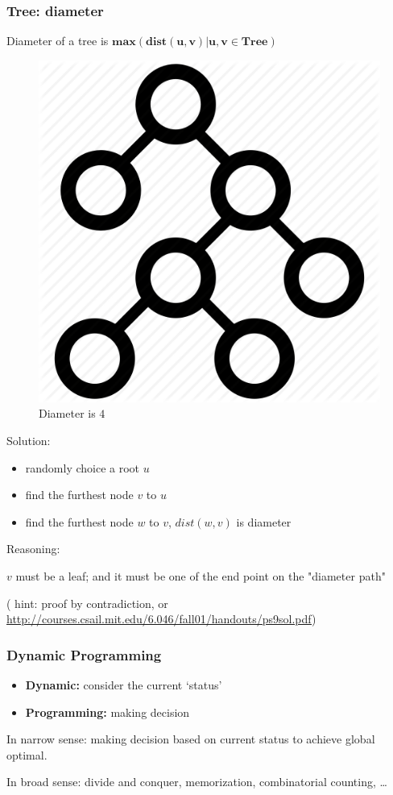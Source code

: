 \documentclass{beamer}
\begin{document}
\begin{frame}
  \frametitle{Tree: diameter}
\begin{definition}
  Diameter of a tree is $\mathbf{max(dist(u, v) | u, v \in Tree)}$
\end{definition}
\begin{minipage}{.3\textwidth}
  \hspace{-3mm} 
  \begin{figure}[]
    \includegraphics[width=.6\textwidth]{pics/tree.png} 
    \caption{Diameter is $4$}
  \end{figure} 
\end{minipage}%
\begin{minipage}{.7\textwidth}
 {Solution:}
\begin{itemize}
  \item<2-> randomly choice a root $u$
  \item<3-> find the furthest node $v$ to $u$
  \item<4-> find the furthest node $w$ to $v$, $dist(w, v)$ is diameter
\end{itemize}  
\end{minipage}
 {
  Reasoning: 

  $v$ must be a leaf; and it must be one of the end point on the "diameter path" 
  
  \footnotesize{( hint: proof by contradiction, or \url{http://courses.csail.mit.edu/6.046/fall01/handouts/ps9sol.pdf})}
}

\end{frame}

\begin{frame}
  \frametitle{Dynamic Programming}
  \begin{itemize}
    \item \textbf{Dynamic:} consider the current `status'
    \item \textbf{Programming:} making decision
  \end{itemize}
   {In narrow sense: making decision based on current status to achieve global optimal.}

   {In broad sense: divide and conquer, memorization, combinatorial counting, \ldots}
\end{frame}
\end{document}
